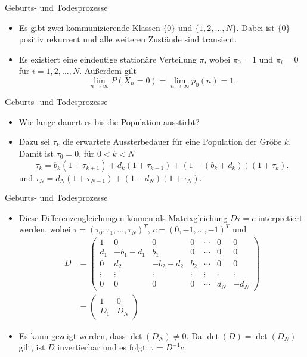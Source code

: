 \documentclass{beamer}
\begin{document}
\begin{frame}{Geburts- und Todesprozesse}
  \begin{itemize}
  \item Es gibt zwei kommunizierende Klassen $\{0\}$ und $\{1,2,\dots,N\}$. Dabei ist $\{0\}$ positiv rekurrent und alle weiteren Zustände sind transient.
  \item Es existiert eine
    eindeutige stationäre Verteilung $π$, wobei $π_0 = 1$ und $π_i = 0$
    für $i = 1,2,\dots,N$. Außerdem gilt
    \[
      \lim_{n→∞} P(X_n = 0) = \lim_{n→∞}p_0(n) = 1.
    \]
  \end{itemize}
\end{frame}
\begin{frame}{Geburts- und Todesprozesse}
  \begin{itemize}
  \item Wie lange dauert es bis die Population ausstirbt?
  \item Dazu sei $τ_k$ die erwartete Aussterbedauer für eine Population der Größe $k$. Damit ist $τ_0 = 0$, für $0 < k < N$
    \[
      τ_k = b_k(1+τ_{k+1}) + d_k(1 + τ_{k-1}) + (1-(b_k + d_k))(1+τ_k).
    \]
    und $τ_N = d_N(1+τ_{N-1}) + (1-d_N)(1+τ_N)$.
  \end{itemize}
\end{frame}
\begin{frame}{Geburts- und Todesprozesse}
  \begin{itemize}
    \item Diese Differenzengleichungen können als Matrixgleichung $Dτ = c$ interpretiert werden, wobei $τ =
    (τ_0,τ_1,\dots,τ_N)^T$, $c = (0,-1,\dots,-1)^T$ und
    \begin{align*}
      D &=
  \begin{pmatrix}
    1 & 0 & 0 & 0 & \cdots & 0 & 0 \\
    d_1 & -b_1-d_1 & b_1 & 0 & \cdots & 0 & 0 \\
    0 & d_2 & -b_2-d_2 & b_2 & \cdots & 0 & 0 \\
    \vdots & \vdots & \vdots & \vdots & \vdots & \vdots & \vdots \\
    0 & 0 & 0 & 0 & \cdots & d_N & -d_N 
  \end{pmatrix} \\
        &= \begin{pmatrix}
      1 & 0 \\
      D_1 & D_N
    \end{pmatrix}
    \end{align*}
  \item Es kann gezeigt werden, dass $\det(D_N) ≠ 0$. Da $\det(D) = \det(D_N)$ gilt, ist $D$ invertierbar und es folgt: $τ = D^{-1}c$.
  \end{itemize}
\end{frame}
\end{document}
